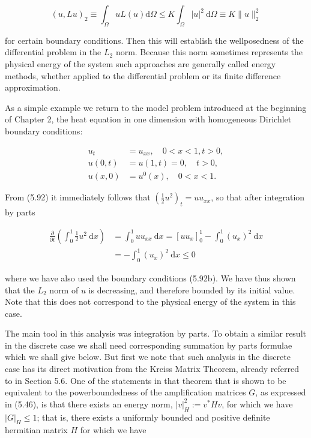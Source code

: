 \documentclass[10pt]{article}
\begin{document}
\[
(u, L u)_{2} \equiv \int_{\Omega} u L(u) \mathrm{d} \Omega \leq K \int_{\Omega}|u|^{2} \mathrm{~d} \Omega \equiv K\|u\|_{2}^{2}
\]

for certain boundary conditions. Then this will establish the wellposedness of the differential problem in the \(L_{2}\) norm. Because this norm sometimes represents the physical energy of the system such approaches are generally called energy methods, whether applied to the differential problem or its finite difference approximation.

As a simple example we return to the model problem introduced at the beginning of Chapter 2, the heat equation in one dimension with homogeneous Dirichlet boundary conditions:

\[
\begin{aligned}
u_{t} & =u_{x x}, \quad 0<x<1, t>0, \\
u(0, t) & =u(1, t)=0, \quad t>0, \\
u(x, 0) & =u^{0}(x), \quad 0<x<1 .
\end{aligned}
\]

From (5.92) it immediately follows that \(\left(\frac{1}{2} u^{2}\right)_{t}=u u_{x x}\), so that after integration by parts

\[
\begin{aligned}
\frac{\partial}{\partial t}\left(\int_{0}^{1} \frac{1}{2} u^{2} \mathrm{~d} x\right) & =\int_{0}^{1} u u_{x x} \mathrm{~d} x=\left[u u_{x}\right]_{0}^{1}-\int_{0}^{1}\left(u_{x}\right)^{2} \mathrm{~d} x \\
& =-\int_{0}^{1}\left(u_{x}\right)^{2} \mathrm{~d} x \leq 0
\end{aligned}
\]

where we have also used the boundary conditions (5.92b). We have thus shown that the \(L_{2}\) norm of \(u\) is decreasing, and therefore bounded by its initial value. Note that this does not correspond to the physical energy of the system in this case.

The main tool in this analysis was integration by parts. To obtain a similar result in the discrete case we shall need corresponding summation by parts formulae which we shall give below. But first we note that such analysis in the discrete case has its direct motivation from the Kreiss Matrix Theorem, already referred to in Section 5.6. One of the statements in that theorem that is shown to be equivalent to the powerboundedness of the amplification matrices \(G\), as expressed in (5.46), is that there exists an energy norm, \(|v|_{H}^{2}:=v^{*} H v\), for which we have \(|G|_{H} \leq 1\); that is, there exists a uniformly bounded and positive definite hermitian matrix \(H\) for which we have
\end{document}

